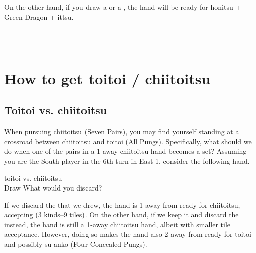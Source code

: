 \bp
{}\xi\xi\bei\bei~~\fa\rfa\fa\\
\xi~\bei\bei\rbei~~\fa\rfa\fa
\ep

On the other hand, if you draw a {\large{}} or a {\large{}}, the hand will be ready for {\jap honitsu} + Green Dragon + {\jap ittsu}. 

\bp
{}\bei\bei~~\fa\rfa\fa\\
\bei\bei~~\fa\rfa\fa
\ep

\newpage
\section{How to get {\jap toitoi} / {\jap chiitoitsu}} \label{sec:toi}

\subsection{{\jap Toitoi} vs. {\jap chiitoitsu}}
When pursuing {\jap chiitoitsu} (Seven Pairs), you may find yourself standing at a crossroad between {\jap chiitoitsu} and {\jap toitoi} (All Pungs). Specifically, what should we do when one of the pairs in a 1-away {\jap chiitoitsu} hand becomes a set? Assuming you are the South player in the 6th turn in East-1, consider the following hand. 

\bigskip
\begin{itembox}[r]{{\jap toitoi} vs. {\jap chiitoitsu}}
\bp
{}\fa\fa\bei~\\
\hspace{290pt}\footnotesize{Draw}
\ep
\vspace{-17pt}What would you discard? \vspace{-5pt}
\end{itembox}

\bigskip
\noindent If we discard the {\large{}} that we drew, the hand is 1-away from ready for {\jap chiitoitsu}, accepting {\large{}\bei} (3 kinds--9 tiles). On the other hand, if we keep it and discard the {\large{}} instead, the hand is still a 1-away {\jap chiitoitsu} hand, albeit with smaller tile acceptance. However, doing so makes the hand also 2-away from ready for {\jap toitoi} and possibly {\jap su anko} (Four Concealed Pungs). 


